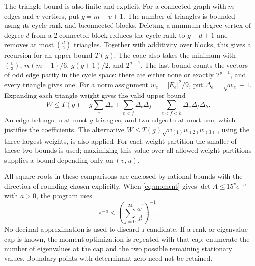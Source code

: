 The triangle bound is also finite and explicit. For a connected graph with $m$ edges and $v$ vertices, put $g=m-v+1$. The number of triangles is bounded using its cycle rank and biconnected blocks. Deleting a minimum-degree vertex of degree $d$ from a 2-connected block reduces the cycle rank to $g-d+1$ and removes at most $\binom d2$ triangles. Together with additivity over blocks, this gives a recursion for an upper bound $T(g)$. The code also takes the minimum with $\binom v3$, $m(m-1)/6$, $g(g+1)/2$, and $2^{g-1}$. The last bound counts the vectors of odd edge parity in the cycle space: there are either none or exactly $2^{g-1}$, and every triangle gives one. For a norm assignment $w_e=|E_e|^2/9$, put $\Delta_e=\sqrt{w_e}-1$. Expanding each triangle weight gives the valid upper bound
\[
 W\le T(g)+g\sum_e\Delta_e+
       \sum_{e<f}\Delta_e\Delta_f+
       \sum_{e<f<h}\Delta_e\Delta_f\Delta_h.
\]
An edge belongs to at most $g$ triangles, and two edges to at most one, which justifies the coefficients. The alternative $W\le T(g)\sqrt{w_{(1)}w_{(2)}w_{(3)}}$, using the three largest weights, is also applied. For each weight partition the smaller of these two bounds is used; maximizing this value over all allowed weight partitions supplies a bound depending only on $(v,u)$.

All square roots in these comparisons are enclosed by rational bounds with the direction of rounding chosen explicitly. When \eqref{eq:moment} gives $\det A\le15^v e^{-a}$ with $a>0$, the program uses
\[
 e^{-a}\le\left(\sum_{j=0}^{24}\frac{a^j}{j!}\right)^{-1}.
\]
No decimal approximation is used to discard a candidate. If a rank or eigenvalue cap is known, the moment optimization is repeated with that cap: enumerate the number of eigenvalues at the cap and the two possible remaining stationary values. Boundary points with determinant zero need not be retained.

